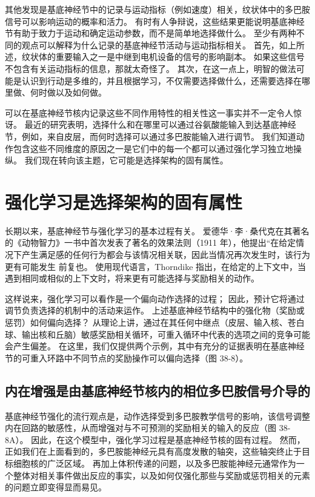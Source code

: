 其他发现是基底神经节中的记录与运动指标（例如速度）相关，纹状体中的多巴胺信号可以影响运动的概率和活力。 有时有人争辩说，这些结果更能说明基底神经节有助于致力于运动和确定运动参数，而不是简单地选择做什么。 至少有两种不同的观点可以解释为什么记录的基底神经节活动与运动指标相关。 首先，如上所述，纹状体的重要输入之一是中继到电机设备的信号的影响副本。 如果这些信号不包含有关运动指标的信息，那就太奇怪了。 其次，在这一点上，明智的做法可能是认识到行动是多维的，并且根据学习，不仅需要选择做什么，还需要选择在哪里做、何时做以及如何做。

可以在基底神经节核内记录这些不同作用特性的相关性这一事实并不一定令人惊讶。 最近的研究表明，选择什么和在哪里可以通过谷氨酸能输入到达基底神经节，例如，来自皮层，而何时选择可以通过多巴胺能输入进行调节。 我们知道动作包含这些不同维度的原因之一是它们中的每一个都可以通过强化学习独立地操纵。 我们现在转向该主题，它可能是选择架构的固有属性。


\section{强化学习是选择架构的固有属性}
长期以来，基底神经节与强化学习的基本过程有关。 爱德华·李·桑代克在其著名的《动物智力》一书中首次发表了著名的效果法则（1911 年），他提出“在给定情况下产生满足感的任何行为都会与该情况相关联，因此当情况再次发生时，该行为更有可能发生 前复也。 使用现代语言，Thorndike 指出，在给定的上下文中，当遇到相同或相似的上下文时，将来更有可能选择与奖励相关的动作。

这样说来，强化学习可以看作是一个偏向动作选择的过程； 因此，预计它将通过调节负责选择的机制中的活动来运作。 上述基底神经节结构中的强化物（奖励或惩罚）如何偏向选择？ 从理论上讲，通过在其任何中继点（皮层、输入核、苍白球、输出核和丘脑）敏感奖励相关循环，可重入循环中代表的选项之间的竞争可能会产生偏差。 在这里，我们仅提供两个示例，其中有充分的证据表明在基底神经节的可重入环路中不同节点的奖励操作可以偏向选择（图 38-8）。

\subsection{内在增强是由基底神经节核内的相位多巴胺信号介导的}
基底神经节强化的流行观点是，动作选择受到多巴胺教学信号的影响，该信号调整内在回路的敏感性，从而增强对与不可预测的奖励相关的输入的反应（图 38-8A）。 因此，在这个模型中，强化学习过程是基底神经节核的固有过程。 然而，正如我们在上面看到的，多巴胺能神经元具有高度发散的轴突，这些轴突终止于目标细胞核的广泛区域。 再加上体积传递的问题，以及多巴胺能神经元通常作为一个整体对相关事件做出反应的事实，以及如何仅强化那些与奖励或惩罚相关的元素的问题立即变得显而易见。

